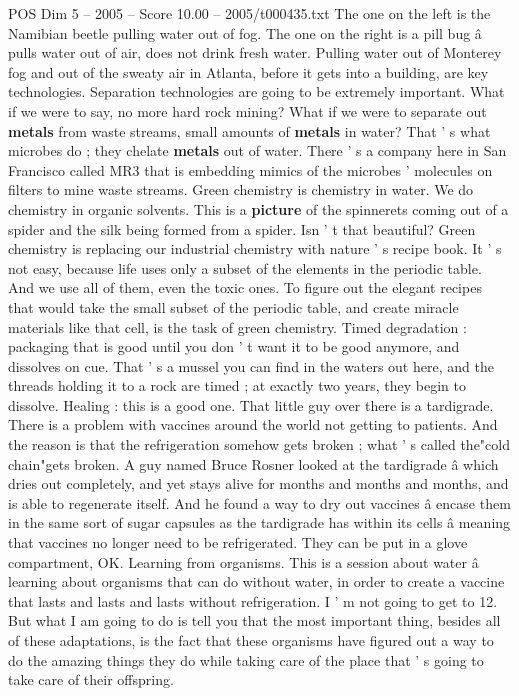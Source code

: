 \begin{textsample}{POS Dim 5 – 2005 – Score 10.00 – 2005/t000435.txt}
The one on the left is the Namibian beetle pulling water out of fog.
The one on the right is a pill bug â pulls water out of air, does not drink fresh water.
Pulling water out of Monterey fog and out of the sweaty air in Atlanta, before it gets into a building, are key technologies.
Separation technologies are going to be extremely important.
What if we were to say, no more hard rock mining?
What if we were to separate out \textbf{metals} from waste streams, small amounts of \textbf{metals} in water?
That ' s what microbes do ; they chelate \textbf{metals} out of water.
There ' s a company here in San Francisco called MR3 that is embedding mimics of the microbes ' molecules on filters to mine waste streams.
Green chemistry is chemistry in water.
We do chemistry in organic solvents.
This is a \textbf{picture} of the spinnerets coming out of a spider and the silk being formed from a spider.
Isn ' t that beautiful?
Green chemistry is replacing our industrial chemistry with nature ' s recipe book.
It ' s not easy, because life uses only a subset of the elements in the periodic table.
And we use all of them, even the toxic ones.
To figure out the elegant recipes that would take the small subset of the periodic table, and create miracle materials like that cell, is the task of green chemistry.
Timed degradation : packaging that is good until you don ' t want it to be good anymore, and dissolves on cue.
That ' s a mussel you can find in the waters out here, and the threads holding it to a rock are timed ; at exactly two years, they begin to dissolve.
Healing : this is a good one.
That little guy over there is a tardigrade.
There is a problem with vaccines around the world not getting to patients.
And the reason is that the refrigeration somehow gets broken ; what ' s called the"cold chain"gets broken.
A guy named Bruce Rosner looked at the tardigrade â which dries out completely, and yet stays alive for months and months and months, and is able to regenerate itself.
And he found a way to dry out vaccines â encase them in the same sort of sugar capsules as the tardigrade has within its cells â meaning that vaccines no longer need to be refrigerated.
They can be put in a glove compartment, OK.
Learning from organisms.
This is a session about water â learning about organisms that can do without water, in order to create a vaccine that lasts and lasts and lasts without refrigeration.
I ' m not going to get to 12.
But what I am going to do is tell you that the most important thing, besides all of these adaptations, is the fact that these organisms have figured out a way to do the amazing things they do while taking care of the place that ' s going to take care of their offspring.

\end{textsample}
